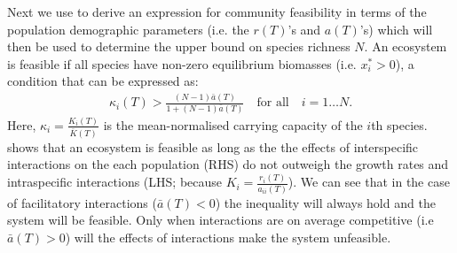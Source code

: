 \documentclass{article}
\begin{document}
Next we use  to derive an expression for community feasibility in terms of the population demographic parameters (i.e. the $r(T)$'s and $a(T)$'s) which will then be used to determine the upper bound on species richness $N$. An ecosystem is feasible if all species have non-zero equilibrium biomasses (i.e. $x_i^* > 0 $), a condition that can be expressed as:
\begin{align} \label{EQ:Feas_sp}
  \kappa_i(T) > \frac{(N-1)\bar{a}(T)}{1 + (N-1)\bar{a}(T)} \quad \text{for all} \quad i = 1 \ldots N.
\end{align}
Here, $\kappa_i = \frac{K_i(T)}{\bar{K}(T)}$ is the mean-normalised carrying capacity of the $i$th species.  shows that an ecosystem is feasible as long as the the effects of interspecific interactions on the each population (RHS) do not outweigh the growth rates and intraspecific interactions (LHS; because $K_i = \frac{r_i(T)}{a_{ii}(T)}$). We can see that in the case of facilitatory interactions ($\bar{a}(T) < 0$) the inequality will always hold and the system will be feasible. Only when interactions are on average competitive (i.e $\bar{a}(T) > 0$) will the effects of interactions make the system unfeasible.
\end{document}
